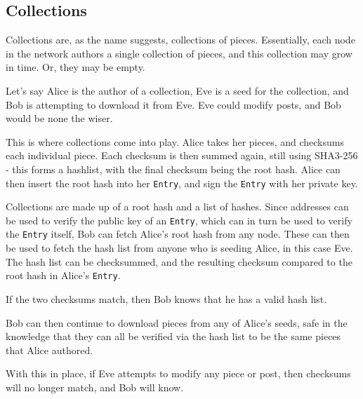 \subsection{Collections}
\begin{multicols*}{2}
Collections are, as the name suggests, collections of pieces. Essentially, each
node in the network authors a single collection of pieces, and this collection
may grow in time. Or, they may be empty.

Let's say Alice is the author of a collection, Eve is a seed for the
collection, and Bob is attempting to download it from Eve. Eve could modify
posts, and Bob would be none the wiser. 

This is where collections come into play. Alice takes her pieces, and checksums
each individual piece. Each checksum is then summed again, still using SHA3-256
- this forms a hashlist, with the final checksum being the root hash. Alice can
then insert the root hash into her \texttt{Entry}, and sign the \texttt{Entry} with her
private key.

Collections are made up of a root hash and a list of hashes.  Since
addresses can be used to verify the public key of an \texttt{Entry}, which can in turn be
used to verify the \texttt{Entry} itself, Bob can fetch Alice's root hash from any node.
These can then be used to fetch the hash list from anyone who is seeding Alice,
in this case Eve. The hash list can be checksummed, and the resulting checksum
compared to the root hash in Alice's \texttt{Entry}. 

If the two checksums match, then Bob knows that he has a valid hash list.

Bob can then continue to download pieces from any of Alice's seeds, safe in the
knowledge that they can all be verified via the hash list to be the same pieces
that Alice authored. 

With this in place, if Eve attempts to modify any piece or post, then checksums
will no longer match, and Bob will know.
\end{multicols*}
